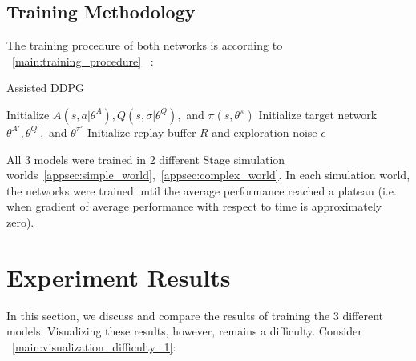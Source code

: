 \subsection{Training Methodology}
The training procedure of both networks is according to ~\autoref{main:training_procedure} ~\cite{xie_learning_2018}:
\begin{algorithm}[H]
\caption{Assisted DDPG}
\label{main:training_procedure}
Initialize $A(s, a|\theta^A), Q(s, \sigma|\theta^Q),$ and $\pi(s, \theta^\pi)$\;
Initialize target network $\theta^{A'}, \theta^{Q'},$ and $\theta^{\pi'}$\;
Initialize replay buffer $R$ and exploration noise $\epsilon$\;
\end{algorithm}

All 3 models were trained in 2 different Stage simulation worlds~\autoref{appsec:simple_world},~\autoref{appsec:complex_world}. In each simulation world, the networks were trained until the average performance reached a plateau (i.e. when gradient of average performance with respect to time is approximately zero).


\section{Experiment Results}
In this section, we discuss and compare the results of training the 3 different models. Visualizing these results, however, remains a difficulty. Consider ~\autoref{main:visualization_difficulty_1}:

